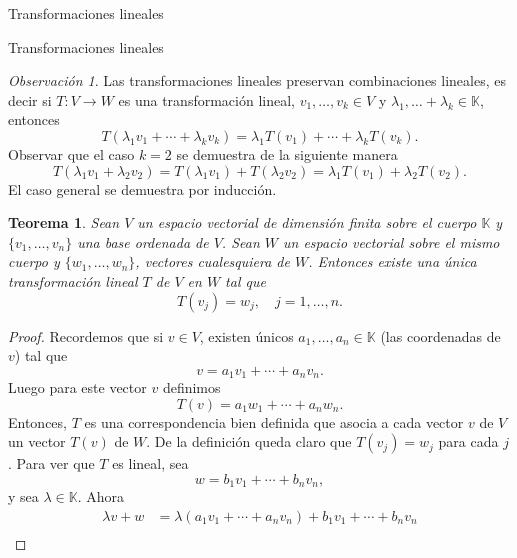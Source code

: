 \documentclass[a4paper,12pt,twoside,spanish,reqno]{amsbook}
\newtheorem{teorema}{Teorema}[section]
\theoremstyle{definition}
\theoremstyle{remark}
\newtheorem{obs}{Observaci\'on}[section]
\newcommand{\K}{\mathbb K}
\begin{document}
\begin{chapter}{Transformaciones lineales}
\begin{section}{Transformaciones lineales}
        \begin{obs}
            Las transformaciones lineales preservan  combinaciones lineales, es decir si $T:V \to W$ es una transformación lineal, $ v_1,\ldots,v_k \in V$ y $\lambda_1, \ldots+ \lambda_k \in \K$,  entonces
            $$
            T(\lambda_1 v_1 + \cdots+ \lambda_k v_k) = \lambda_1 T(v_1) + \cdots+ \lambda_k T(v_k).
            $$
            Observar que el caso $k=2$ se demuestra de la siguiente manera
            $$
            T(\lambda_1 v_1 +  \lambda_2 v_2) =T(\lambda_1 v_1) + T(\lambda_2 v_2) =\lambda_1 T(v_1) + \lambda_2T( v_2).
            $$
            El caso general se demuestra por inducción. 
        
        \end{obs}
        
        
        \begin{teorema}\label{th-tl-definida-en-base}
            Sean $V$ un espacio vectorial de dimensión finita sobre el cuerpo $\K$ y $\{v_1,\ldots,v_n\}$  una base ordenada de $V$. Sean $W$ un espacio vectorial sobre el mismo cuerpo y $\{w_1,\ldots,w_n\}$, vectores cualesquiera de $W$. Entonces existe una única transformación  lineal $T$ de $V$ en $W$ tal que
            \begin{equation*}
            T(v_j) = w_j, \quad j=1,\ldots,n.
            \end{equation*}
        \end{teorema}
            \begin{proof}
                Recordemos que si $v \in V$,  existen únicos $a_1,\ldots,a_n \in \K$ (las coordenadas de $v$) tal que $$v = a_1v_1 + \cdots+a_n v_n.$$  Luego para este vector $v$  definimos
                \begin{equation*}
                    T(v) = a_1w_1 + \cdots+a_n w_n.
                \end{equation*}
                Entonces, $T$ es una correspondencia bien definida que asocia a cada vector $v$ 
                de $V$ un vector $T(v)$ de $W$. De la definición queda claro que $T(v_j) = w_j$ para cada $j$. Para ver que $T$ es lineal, sea
                \begin{equation*}
                    w = b_1v_1 + \cdots+b_n v_n,
                \end{equation*}
                y sea  $\lambda \in \K$. Ahora
                \begin{align*}
                    \lambda v+w &= \lambda(a_1v_1 + \cdots+a_n v_n) + b_1v_1 + \cdots+b_n v_n \\

\end{align*}
\end{proof}
\end{section}
\end{chapter}
\end{document}
